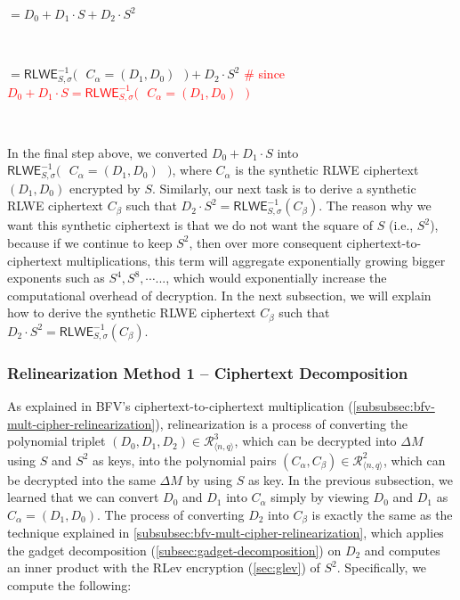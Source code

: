 

$= {D_0 + D_1\cdot S} + D_2\cdot S^2$

$ $

$= \textsf{RLWE}_{S, \sigma}^{-1}\bm{(}\text{ } C_\alpha = (D_1, D_0) \text{ }\bm{)} + D_2\cdot S^2$ \textcolor{red}{ \text{ } \# since $D_0 + D_1\cdot S = \textsf{RLWE}_{S, \sigma}^{-1}\bm{(}\text{ } C_\alpha=(D_1, D_0) \text{ } \bm{)}$ }

$ $

In the final step above, we converted $D_0 + D_1\cdot S$ into $\textsf{RLWE}_{S, \sigma}^{-1}\bm{(}\text{ } C_\alpha=(D_1, D_0) \text{ } \bm{)}$, where $C_\alpha$ is the synthetic RLWE ciphertext $(D_1, D_0)$ encrypted by $S$. Similarly, our next task is to derive a synthetic RLWE ciphertext $C_\beta$ such that $D_2\cdot S^2 = \textsf{RLWE}_{S, \sigma}^{-1}(C_\beta)$. The reason why we want this synthetic ciphertext is that we do not want the square of $S$ (i.e., $ S^2$), because if we continue to keep $ S^2$, then over more consequent ciphertext-to-ciphertext multiplications, this term will aggregate exponentially growing bigger exponents such as $S^4, S^8, \cdots...$, which would exponentially increase the computational overhead of decryption. In the next subsection, we will explain how to derive the synthetic RLWE ciphertext $C_\beta$ such that $D_2\cdot S^2 = \textsf{RLWE}_{S, \sigma}^{-1}(C_\beta)$.

\subsubsection{Relinearization  Method 1 -- Ciphertext Decomposition}
\label{subsubsec:relinearization-gadget-decomposition}

As explained in BFV's ciphertext-to-ciphertext multiplication (\autoref{subsubsec:bfv-mult-cipher-relinearization}), relinearization is a process of converting the polynomial triplet $(D_0, D_1, D_2) \in \mathcal{R}_{\langle n, q \rangle}^{3}$, which can be decrypted into $\Delta M$ using $S$ and $S^2$ as keys, into the polynomial pairs $(C_\alpha, C_\beta)\in \mathcal{R}_{\langle n, q \rangle}^{2}$, which can be decrypted into the same $\Delta M$ by using $S$ as key. In the previous subsection, we learned that we can convert $D_0$ and $D_1$ into $C_\alpha$ simply by viewing $D_0$ and $D_1$ as  $C_\alpha = (D_1, D_0)$. The process of converting $D_2$ into $C_\beta$ is exactly the same as the technique explained in \autoref{subsubsec:bfv-mult-cipher-relinearization}, which applies the gadget decomposition (\autoref{subsec:gadget-decomposition}) on $D_2$ and computes an inner product with the RLev encryption (\autoref{sec:glev}) of $S^2$. Specifically, we compute the following:

